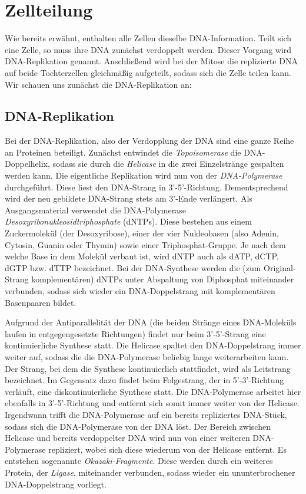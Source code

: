 \section{Zellteilung}
\label{sec:bio:zell}

Wie bereits erwähnt, enthalten alle Zellen dieselbe DNA-Information. Teilt sich eine Zelle, so muss ihre DNA zunächst verdoppelt werden. Dieser Vorgang wird DNA-Replikation genannt. Anschließend wird bei der Mitose die replizierte DNA auf beide Tochterzellen gleichmäßig aufgeteilt, sodass sich die Zelle teilen kann. Wir schauen uns zunächst die DNA-Replikation an:

\subsection{DNA-Replikation}
\label{sec:bio:zell:repli}

Bei der DNA-Replikation, also der Verdopplung der DNA sind eine ganze Reihe an Proteinen beteiligt. Zunächst entwindet die \emph{Topoisomerase} die DNA-Doppelhelix, sodass sie durch die \emph{Helicase} in die zwei Einzelstränge gespalten werden kann. Die eigentliche Replikation wird nun von der \emph{DNA-Polymerase} durchgeführt. Diese liest den DNA-Strang in 3'-5'-Richtung. Dementsprechend wird der neu gebildete DNA-Strang stets am 3'-Ende verlängert.
%
Als Ausgangsmaterial verwendet die DNA-Polymerase \emph{Desoxyribonukleosidtriphosphate} (dNTPs). Diese bestehen aus einem Zuckermolekül (der Desoxyribose), einer der vier Nukleobasen (also Adenin, Cytosin, Guanin oder Thymin) sowie einer Triphosphat-Gruppe. Je nach dem welche Base in dem Molekül verbaut ist, wird dNTP auch als dATP, dCTP, dGTP bzw. dTTP bezeichnet. Bei der DNA-Synthese werden die (zum Original-Strang komplementären) dNTPs unter Abspaltung von Diphosphat miteinander verbunden, sodass sich wieder ein DNA-Doppelstrang mit komplementären Basenpaaren bildet.

Aufgrund der Antiparallelität der DNA (die beiden Stränge eines DNA-Moleküls laufen in entgegengesetzte Richtungen) findet nur beim 3'-5'-Strang eine kontinuierliche Synthese statt. Die Helicase spaltet den DNA-Doppelstrang immer weiter auf, sodass die die DNA-Polymerase beliebig lange weiterarbeiten kann. Der Strang, bei dem die Synthese kontinuierlich stattfindet, wird als Leitstrang bezeichnet. Im Gegensatz dazu findet beim Folgestrang, der in 5'-3'-Richtung verläuft, eine diskontinuierliche Synthese statt. Die DNA-Polymerase arbeitet hier ebenfalls in 3'-5'-Richtung und entfernt sich somit immer weiter von der Helicase. Irgendwann trifft die DNA-Polymerase auf ein bereits repliziertes DNA-Stück, sodass sich die DNA-Polymerase von der DNA löst. Der Bereich zwischen Helicase und bereits verdoppelter DNA wird nun von einer weiteren DNA-Polymerase repliziert, wobei sich diese wiederum von der Helicase entfernt. Es entstehen sogenannte \emph{Okazaki-Fragmente}. Diese werden durch ein weiteres Protein, der \emph{Ligase}, miteinander verbunden, sodass wieder ein ununterbrochener DNA-Doppelstrang vorliegt. 

